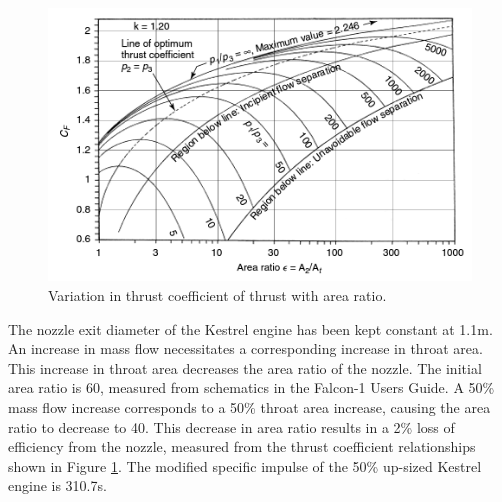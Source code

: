 		
		\begin{figure}[ht]
			\centering
			\includegraphics[width=0.7\linewidth]{"figures/3_vehicle_design/Thrust Coefficient - Arat"}
			\caption{Variation in thrust coefficient of thrust with area ratio\cite{RPE}.}
			\label{fig:ThrustCoefficient-Arat}
		\end{figure}
		The nozzle exit diameter of the Kestrel engine has been kept constant at 1.1m. An increase in mass flow necessitates a corresponding increase in throat area. This increase in throat area decreases the area ratio of the nozzle. The initial area ratio is 60, measured from schematics in the Falcon-1 Users Guide. A 50\% mass flow increase corresponds to a 50\% throat area increase, causing the area ratio to decrease to 40. This decrease in area ratio results in a 2\% loss of efficiency from the nozzle, measured from the thrust coefficient relationships shown in Figure \ref{fig:ThrustCoefficient-Arat}\cite{RPE}. The modified specific impulse of the 50\% up-sized Kestrel engine is 310.7s. 
		
		
